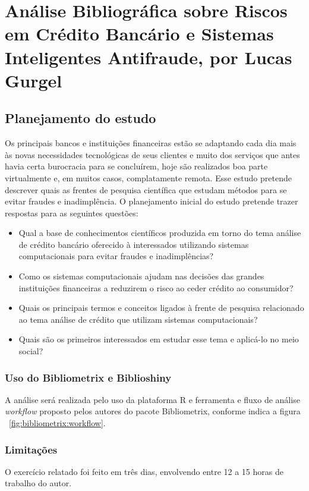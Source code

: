 \chapter{Análise Bibliográfica sobre Riscos em Crédito Bancário e Sistemas Inteligentes Antifraude, por Lucas Gurgel\label{chap:bibliometria:lggurgel}}

\section{Planejamento do estudo}
Os principais bancos e instituições financeiras estão se adaptando cada dia mais às novas necessidades tecnológicas de seus clientes e muito dos serviços que antes havia certa burocracia para se concluírem, hoje são realizados boa parte virtualmente e, em muitos casos, complatamente remota.
Esse estudo pretende descrever quais as frentes de pesquisa científica que estudam métodos para se evitar fraudes e inadimplência. 
O planejamento inicial do estudo pretende trazer respostas para as seguintes questões:

\begin{itemize}
    \item Qual a base de conhecimentos científicos produzida em torno do tema análise de crédito bancário oferecido à interessados utilizando sistemas computacionais para evitar fraudes e inadimplências? 
    \item Como os sistemas computacionais ajudam nas decisões das grandes instituições financeiras a reduzirem o risco ao ceder crédito ao consumidor?
    \item Quais os principais termos e conceitos ligados à frente de pesquisa relacionado ao tema análise de crédito que utilizam sistemas computacionais?
    \item Quais são os primeiros interessados em estudar esse tema e aplicá-lo no meio social?
\end{itemize}

\subsection{Uso do Bibliometrix e Biblioshiny}
A análise será realizada pelo uso da plataforma R e ferramenta e fluxo de análise \textit{workflow} proposto pelos autores do pacote Bibliometrix, conforme indica a figura ~\ref{fig:bibliometrix:workflow}.

\subsection{Limitações} O exercício relatado foi feito em três dias, envolvendo entre 12 a 15 horas de trabalho do autor.


